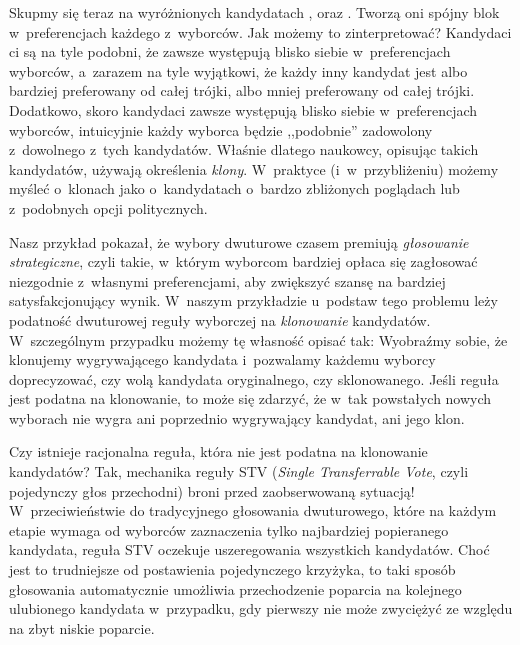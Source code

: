 Skupmy się teraz na wyróżnionych kandydatach ,  oraz .
Tworzą oni spójny blok w~preferencjach każdego z~wyborców. Jak możemy to zinterpretować?
Kandydaci ci są na tyle podobni, że zawsze występują blisko siebie w~preferencjach wyborców, a~zarazem na tyle wyjątkowi,
że każdy inny kandydat jest albo bardziej preferowany od całej trójki, albo mniej preferowany od całej trójki.
Dodatkowo, skoro kandydaci zawsze występują blisko siebie w~preferencjach wyborców, intuicyjnie każdy wyborca będzie
,,podobnie'' zadowolony z~dowolnego z~tych kandydatów. Właśnie dlatego naukowcy, opisując takich kandydatów,
używają określenia \emph{klony}. W~praktyce (i~w~przybliżeniu) możemy myśleć o~klonach jako o~kandydatach o~bardzo zbliżonych poglądach lub
z~podobnych opcji politycznych.

Nasz przykład pokazał, że wybory dwuturowe czasem premiują
\emph{głosowanie strategiczne}, czyli takie, w~którym wyborcom 
bardziej opłaca się zagłosować niezgodnie z~własnymi preferencjami,
aby zwiększyć szansę na bardziej satysfakcjonujący wynik.
%
%
%
%
W~naszym przykładzie u~podstaw tego problemu leży podatność dwuturowej reguły wyborczej na \emph{klonowanie} kandydatów.
W~szczególnym przypadku możemy tę własność opisać tak: Wyobraźmy sobie, że klonujemy wygrywającego kandydata i~pozwalamy każdemu wyborcy doprecyzować, czy wolą kandydata oryginalnego, czy sklonowanego. Jeśli reguła jest podatna na klonowanie, to może się zdarzyć, że w~tak powstałych nowych wyborach nie wygra ani poprzednio wygrywający kandydat, ani jego klon.
%
%
%
%
%
%
%
%

Czy istnieje
racjonalna reguła, która nie jest podatna na klonowanie kandydatów?
Tak, mechanika reguły STV (\emph{Single Transferrable Vote}, czyli pojedynczy głos przechodni) broni przed
zaobserwowaną sytuacją! W~przeciwieństwie do tradycyjnego głosowania dwuturowego,
które na każdym etapie wymaga od wyborców zaznaczenia tylko najbardziej
popieranego kandydata, reguła STV oczekuje uszeregowania wszystkich kandydatów.
Choć jest to trudniejsze od postawienia pojedynczego krzyżyka, to
%
%
%
taki sposób głosowania automatycznie umożliwia przechodzenie poparcia na kolejnego ulubionego kandydata w~przypadku,
gdy pierwszy nie może zwyciężyć ze względu na zbyt niskie poparcie. 

